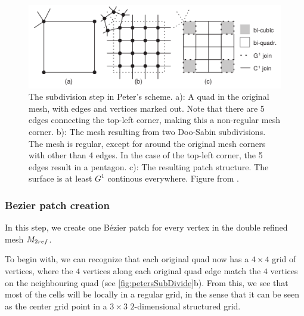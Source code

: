 \begin{figure}
	\centering
	\includegraphics[width = \textwidth]{Pictures/NURBS/petersQuad_to_patches.png}
	\caption{The subdivision step in Peter's scheme. a): A quad in the original mesh, with edges and vertices marked out. Note that there are 5 edges connecting the top-left corner, making this a non-regular mesh corner. b): The mesh resulting from two Doo-Sabin subdivisions. The mesh is regular, except for around the original mesh corners with other than 4 edges. In the case of the top-left corner, the 5 edges result in a pentagon. c): The resulting \Bez patch structure. The surface is at least $G^1$ continous everywhere. Figure from \cite{eck1996automatic}. }
	\label{fig:petersSubDivide}
\end{figure}


\subsubsection{Bezier patch creation}
In this step, we create one B{\'e}zier patch for every vertex in the double refined mesh $\petersControlMeshDobRef$. 

To begin with, we can recognize that each original quad now has a $4 \times 4$ grid of vertices, where the $4$ vertices along each original quad edge match the $4$ vertices on the neighbouring quad (see \autoref{fig:petersSubDivide}b). From this, we see that most of the cells will be locally in a regular grid, in the sense that it can be seen as the center grid point in a $3\times3$ $2$-dimensional structured grid.%


